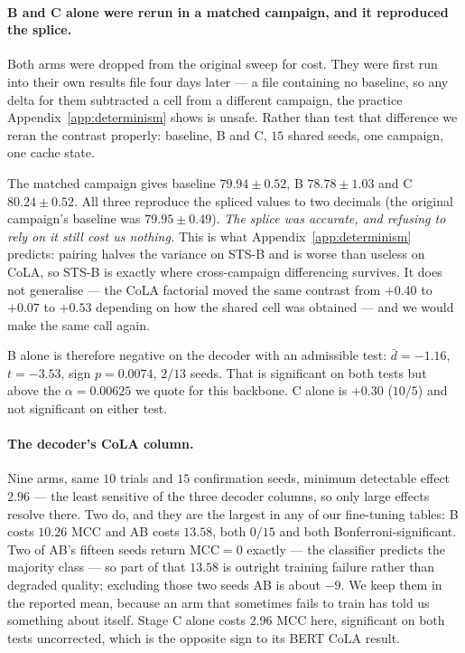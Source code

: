 \documentclass{article}
\begin{document}
\paragraph{B and C alone were rerun in a matched campaign, and it reproduced
the splice.} Both arms were dropped from the original sweep for cost. They were
first run into their own results file four days later --- a file containing no
baseline, so any delta for them subtracted a cell from a different campaign,
the practice Appendix~\ref{app:determinism} shows is unsafe. Rather than test
that difference we reran the contrast properly: baseline, B and C, $15$ shared
seeds, one campaign, one cache state.

The matched campaign gives baseline $79.94 \pm 0.52$, B $78.78 \pm 1.03$ and
C $80.24 \pm 0.52$. All three reproduce the spliced values to two decimals
(the original campaign's baseline was $79.95 \pm 0.49$). \emph{The splice was
accurate, and refusing to rely on it still cost us nothing.} This is what
Appendix~\ref{app:determinism} predicts: pairing halves the variance on STS-B
and is worse than useless on CoLA, so STS-B is exactly where cross-campaign
differencing survives. It does not generalise --- the CoLA factorial moved the
same contrast from $+0.40$ to $+0.07$ to $+0.53$ depending on how the shared
cell was obtained --- and we would make the same call again.

B alone is therefore negative on the decoder with an admissible test:
$\bar{d}=-1.16$, $t=-3.53$, sign $p=0.0074$, $2/13$ seeds. That is significant
on both tests but above the $\alpha=0.00625$ we quote for this backbone. C alone
is $+0.30$ ($10/5$) and not significant on either test.

\paragraph{The decoder's CoLA column.} Nine arms, same $10$ trials and $15$
confirmation seeds, minimum detectable effect $2.96$ --- the least sensitive
of the three decoder columns, so only large effects resolve there. Two do, and
they are the largest in any of our fine-tuning tables: B costs $10.26$ MCC and
AB costs $13.58$, both $0/15$ and both Bonferroni-significant. Two of AB's
fifteen seeds return $\mathrm{MCC}=0$ exactly --- the classifier predicts the
majority class --- so part of that $13.58$ is outright training failure rather
than degraded quality; excluding those two seeds AB is about $-9$. We keep them
in the reported mean, because an arm that sometimes fails to train has told us
something about itself. Stage C alone costs $2.96$ MCC here, significant on both
tests uncorrected, which is the opposite sign to its BERT CoLA result.
\end{document}

